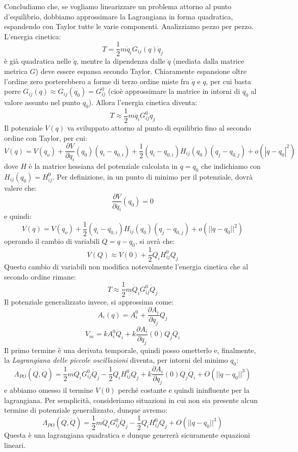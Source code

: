 \documentclass[a4paper,openany]{article}
\begin{document}
	Concludiamo che, se vogliamo linearizzare un problema attorno al punto d'equilibrio, dobbiamo approssimare la Lagrangiana in forma quadratica, espandendo con Taylor tutte le varie componenti. Analizziamo pezzo per pezzo. L'energia cinetica:
	$$
	T = \dfrac{1}{2}m\dot{q}_iG_{ij}(q)\dot{q}_j
	$$ 
	è già quadratica nelle $\dot{q}$, mentre la dipendenza dalle $\dot{q}$ (mediata dalla matrice metrica $G$) deve essere espansa secondo Taylor. Chiaramente espansione oltre l'ordine zero porterebbero a forme di terzo ordine miste fra $\dot{q} \mbox{ e } q$, per cui basta porre $G_{ij}(q) \approx G_{ij}(q_0) = G_{ij}^{0}$ (cioè approssimare la matrice in intorni di $q_0$ al valore assunto nel punto $q_0$). Allora l'energia cinetica diventa:
	$$
	T \approx \dfrac{1}{2}m\dot{q}_iG_{ij}^{0}\dot{q}_j
	$$
	Il potenziale $V(q)$ va sviluppato attorno al punto di equilibrio fino al secondo ordine con Taylor, per cui:
	$$
	V(q) = V(q_o) + \dfrac{\partial V}{\partial q_i}(q_0) (q_i-q_{0,i}) + \dfrac{1}{2}(q_i-q_{0,i})H_{ij}(q_0)(q_j-q_{0,j}) + o(|q-q_0|^2)
	$$
	dove $H$ è la matrice hessiana del potenziale calcolata in $q=q_0$ che indichiamo con $H_{ij}(q_0) = H_{ij}^{0}$. Per definizione, in un punto di minimo per il potenziale, dovrà valere che:
	$$
	\dfrac{\partial V}{\partial q_i}(q_0)  = 0
	$$
	e quindi:
	\begin{equation}\label{key}
		V(q) = V(q_o) + \dfrac{1}{2}(q_i-q_{0,i})H_{ij}(q_0)(q_j-q_{0,j}) + o(||q-q_0||^2)
	\end{equation}
	operando il cambio di variabili $Q = q-q_0$, si avrà che:
	\begin{equation}\label{key}
		V(Q) \approx V(0) + \dfrac{1}{2}Q_i H_{ij}^0 Q_j
	\end{equation}
	Questo cambio di variabili non modifica notevolmente l'energia cinetica che al secondo ordine rimane:
	\begin{equation}\label{key}
		T \approx \dfrac{1}{2}m\dot{Q}_iG_{ij}^{0}\dot{Q}_j
	\end{equation}
	Il potenziale generalizzato invece, si approssima come:
	$$
	A_i(q) = A_{i}^{0} + \dfrac{\partial A_i}{\partial q_j}Q_j 
	$$
	$$
	V_m = kA_{i}^{0}\dot{Q}_i + k\dfrac{\partial A_i}{\partial q_j}(0)Q_j \dot{Q}_i
	$$
	Il primo termine è una derivata temporale, quindi posso ometterlo e, finalmente, la \textit{Lagrangiana delle piccole oscillazioni} diventa, per intorni del minimo $q_0$:
	\begin{equation}
		\Lambda_{PO}(Q,\dot{Q}) = \dfrac{1}{2}m\dot{Q}_iG_{ij}^{0}\dot{Q}_j - \dfrac{1}{2}Q_i H_{ij}^0 Q_j + k\dfrac{\partial A_i}{\partial q_j}(0)Q_j \dot{Q}_i + O(||q-q_0||^{3})
		\label{LagPOG}
	\end{equation}
	e abbiamo omesso il termine $V(0)$ perché costante e quindi ininfluente per la lagrangiana. Per semplicità, consideriamo situazioni in cui non sia presente alcun termine di potenziale generalizzato, dunque avremo:
	\begin{equation}
		\Lambda_{PO}(Q,\dot{Q}) = \dfrac{1}{2}m\dot{Q}_iG_{ij}^{0}\dot{Q}_j - \dfrac{1}{2}Q_i H_{ij}^0 Q_j + O(||q-q_0||^{3})
		\label{LagPO}
	\end{equation}
	Questa è una lagrangiana quadratica e dunque genererà sicuramente equazioni lineari.
\end{document}
